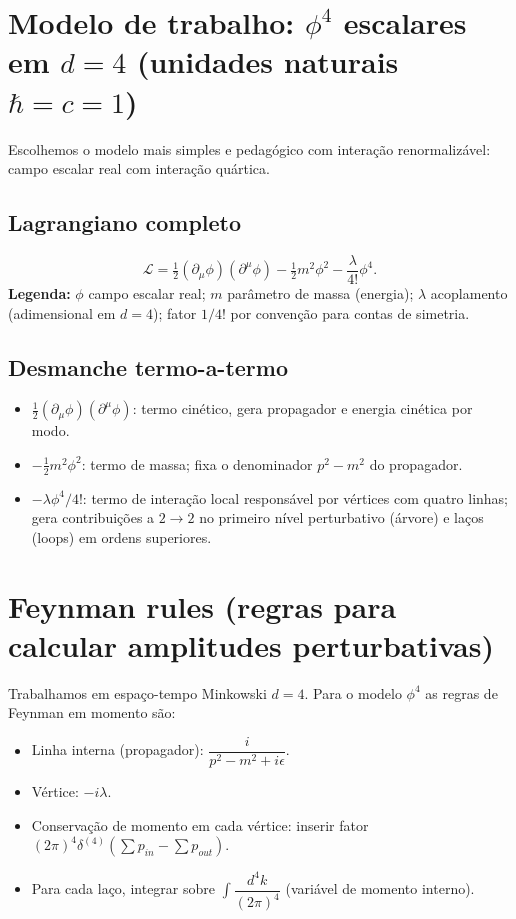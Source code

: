 \documentclass[12pt,a4paper]{article}
\begin{document}
\section{Modelo de trabalho: \(\phi^4\) escalares em \(d=4\) (unidades naturais \(\hbar=c=1\))}
Escolhemos o modelo mais simples e pedagógico com interação renormalizável: campo escalar real com interação quártica.

\subsection{Lagrangiano completo}
\begin{equation}\label{lag_phi4}
\mathcal{L} = \tfrac12(\partial_\mu\phi)(\partial^\mu\phi) - \tfrac12 m^2 \phi^2 - \frac{\lambda}{4!}\phi^4.
\end{equation}
\textbf{Legenda:} \(\phi\) campo escalar real; \(m\) parâmetro de massa (energia); \(\lambda\) acoplamento (adimensional em \(d=4\)); fator \(1/4!\) por convenção para contas de simetria.

\subsection{Desmanche termo-a-termo}
\begin{itemize}
\item \(\tfrac12(\partial_\mu\phi)(\partial^\mu\phi)\): termo cinético, gera propagador e energia cinética por modo.
\item \(-\tfrac12 m^2\phi^2\): termo de massa; fixa o denominador \(p^2 - m^2\) do propagador.
\item \(-\lambda\phi^4/4!\): termo de interação local responsável por vértices com quatro linhas; gera contribuições a \(2\to2\) no primeiro nível perturbativo (árvore) e laços (loops) em ordens superiores.
\end{itemize}

\section{Feynman rules (regras para calcular amplitudes perturbativas)}
Trabalhamos em espaço-tempo Minkowski \(d=4\). Para o modelo \(\phi^4\) as regras de Feynman em momento são:
\begin{itemize}
\item Linha interna (propagador): \(\dfrac{i}{p^2 - m^2 + i\epsilon}\).
\item Vértice: \(-i\lambda\).
\item Conservação de momento em cada vértice: inserir fator \((2\pi)^4\delta^{(4)}(\sum p_{in}-\sum p_{out})\).
\item Para cada laço, integrar sobre \(\int\dfrac{d^4k}{(2\pi)^4}\) (variável de momento interno).
\end{itemize}
\end{document}
